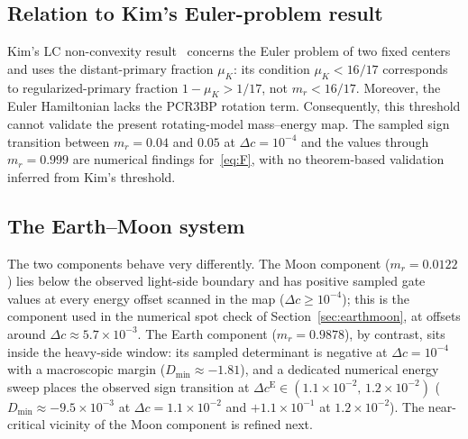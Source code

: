 \documentclass[11pt,reqno]{amsart}
\theoremstyle{plain}
\theoremstyle{definition}
\begin{document}
\subsection{Relation to Kim's Euler-problem result}
Kim's LC non-convexity result~\cite{Kim} concerns the Euler problem of two fixed centers and uses the distant-primary fraction $\mu_K$: its condition $\mu_K<16/17$ corresponds to regularized-primary fraction $1-\mu_K>1/17$, not $m_r<16/17$. Moreover, the Euler Hamiltonian lacks the PCR3BP rotation term. Consequently, this threshold cannot validate the present rotating-model mass--energy map. The sampled sign transition between $m_r=0.04$ and $0.05$ at $\Delta c=10^{-4}$ and the values through $m_r=0.999$ are numerical findings for~\eqref{eq:F}, with no theorem-based validation inferred from Kim's threshold.

\subsection{The Earth--Moon system}
The two components behave very differently. The Moon component ($m_r=0.0122$) lies below the observed light-side boundary and has positive sampled gate values at every energy offset scanned in the map ($\Delta c\ge 10^{-4}$); this is the component used in the numerical spot check of Section~\ref{sec:earthmoon}, at offsets around $\Delta c\approx 5.7\times10^{-3}$. The Earth component ($m_r=0.9878$), by contrast, sits inside the heavy-side window: its sampled determinant is negative at $\Delta c=10^{-4}$ with a macroscopic margin ($D_{\min}\approx-1.81$), and a dedicated numerical energy sweep places the observed sign transition at $\Delta c^{\mathrm E}\in(1.1\times10^{-2},\,1.2\times10^{-2})$ ($D_{\min}\approx-9.5\times10^{-3}$ at $\Delta c=1.1\times10^{-2}$ and $+1.1\times10^{-1}$ at $1.2\times10^{-2}$). The near-critical vicinity of the Moon component is refined next.
\end{document}
